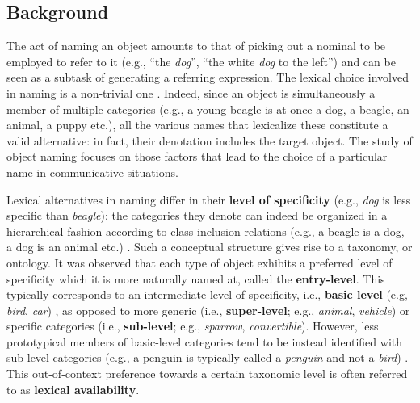 
\subsection{Background}

The act of naming an object amounts to that of picking out a nominal to be employed to refer to it (e.g., ``the \textit{dog}'', ``the white \textit{dog} to the left'') and can be seen as a subtask of generating a referring expression. The lexical choice involved in naming is a non-trivial one \cite{brown1958shall}. Indeed, since an object is simultaneously a member of multiple categories (e.g., a young beagle is at once a dog, a beagle, an animal, a puppy etc.), all the various names that lexicalize these constitute a valid alternative: in fact, their denotation includes the target object. The study of object naming focuses on those factors that lead to the choice of a particular name in communicative situations. 

Lexical alternatives in naming differ in their \textbf{level of specificity} (e.g., \textit{dog} is less specific than \textit{beagle})\cite{cruse1977pragmatics}: the categories they denote can indeed be organized in a hierarchical fashion according to class inclusion relations (e.g., a beagle is a dog, a dog is an animal etc.) \cite{murphy2004big}. Such a conceptual structure gives rise to a taxonomy, or ontology. %
It was observed that each type of object exhibits a preferred level of specificity which it is more naturally named at, called the \textbf{entry-level}. This typically corresponds to an intermediate level of specificity, i.e., \textbf{basic level} (e.g, \textit{bird}, \textit{car}) \cite{rosch1976basic}, as opposed to more generic (i.e., \textbf{super-level}; e.g., \textit{animal}, \textit{vehicle}) or specific categories (i.e., \textbf{sub-level}; e.g., \textit{sparrow}, \textit{convertible}). However, less prototypical members of basic-level categories tend to be instead identified with sub-level categories (e.g., a penguin is typically called a \textit{penguin} and not a \textit{bird}) \cite{jolicoeur1984pictures}. This out-of-context preference towards a certain taxonomic level is often referred to as \textbf{lexical availability}. 

